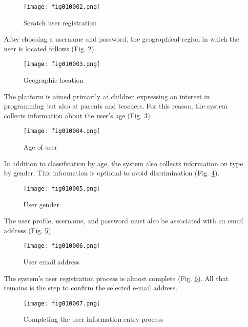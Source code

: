 \begin{figure}[H]
   \centering
   \texttt{[image: fig010002.png]}
   \caption{Scratch user registration}
\label{fig010002}
\end{figure}

After choosing a username and password, the geographical region in which the user is located follows (Fig. \ref{fig010003}).

\begin{figure}[H]
   \centering
   \texttt{[image: fig010003.png]}
   \caption{Geographic location}
\label{fig010003}
\end{figure}

The platform is aimed primarily at children expressing an interest in programming but also at parents and teachers. For this reason, the system collects information about the user's age (Fig. \ref{fig010004}).

\begin{figure}[H]
   \centering
   \texttt{[image: fig010004.png]}
   \caption{Age of user}
\label{fig010004}
\end{figure}

In addition to classification by age, the system also collects information on type by gender. This information is optional to avoid discrimination (Fig. \ref{fig010005}).

\begin{figure}[H]
   \centering
   \texttt{[image: fig010005.png]}
   \caption{User gender}
\label{fig010005}
\end{figure}

The user profile, username, and password must also be associated with an email address (Fig. \ref{fig010006}).

\begin{figure}[H]
   \centering
   \texttt{[image: fig010006.png]}
   \caption{User email address}
\label{fig010006}
\end{figure}

The system's user registration process is almost complete (Fig. \ref{fig010007}). All that remains is the step to confirm the selected e-mail address.

\begin{figure}[H]
   \centering
   \texttt{[image: fig010007.png]}
   \caption{Completing the user information entry process}
\label{fig010007}
\end{figure}

